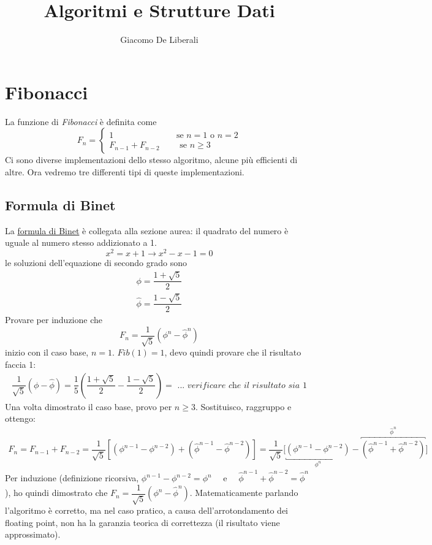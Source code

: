 \documentclass[italian]{article}
\author{Giacomo De Liberali}
\newcommand{\dateright}[1]{\normalfont{\normalsize{\hfill #1 \\}}}
\begin{document}
	
\title{Algoritmi e Strutture Dati}
\maketitle

\tableofcontents
\pagebreak

\section{Fibonacci}
\dateright{21 Settembre 2016}
La funzione di \textit{Fibonacci} è definita come
\[
	F_n =
	\begin{cases*}
		1 \qquad\qquad\qquad\quad \text{ se } n=1 \text{ o } n=2 \\
		F_{n-1} + F_{n-2} \qquad \text{ se } n \geq 3
	\end{cases*}
\]
Ci sono diverse implementazioni dello stesso algoritmo, alcune più efficienti di altre. Ora vedremo tre differenti tipi di queste implementazioni.
\subsection{Formula di Binet}
La \href{https://it.wikipedia.org/wiki/Jacques_Philippe_Marie_Binet#Formula_di_Binet_per_la_successione_di_Fibonacci}{formula di Binet} è collegata alla sezione aurea: il quadrato del numero è uguale al numero stesso addizionato a 1.
\[
	x^2 = x+1 \to x^2 - x - 1 = 0
\]
le soluzioni dell'equazione di secondo grado sono
\begin{gather*}
	\phi = \dfrac{1+\sqrt{5}}{2} \\
	\hat \phi = \dfrac{1-\sqrt{5}}{2}
\end{gather*}
Provare per induzione che
\[
	F_n = \dfrac{1}{\sqrt{5}}\left( \phi^n - \hat \phi^n \right)
\]
inizio con il caso base, $n=1$. $Fib(1) = 1$, devo quindi provare che il risultato faccia 1:
\begin{gather*}
	\dfrac{1}{\sqrt{5}}(\phi - \hat \phi) =
	\dfrac{1}{5} \left( \dfrac{1+\sqrt{5}}{2} - \dfrac{1-\sqrt{5}}{2}\right) = \textit{ ... verificare che il risultato sia } 1
\end{gather*}
Una volta dimostrato il caso base, provo per $n \geq 3$. Sostituisco, raggruppo e ottengo:
\begin{gather*}
	F_n = F_{n-1} + F_{n-2} = \dfrac{1}{\sqrt{5}} \left[ 
	\left( \phi^{n-1} - \phi^{n-2} \right) 
	+
	\left(  {\hat\phi}^{n-1} - {\hat\phi}^{n-2} \right)
	\right] 
	=
	\dfrac{1}{\sqrt{5}} \bigg[
	\underbracket{\left( \phi^{n-1} - \phi^{n-2} \right) }_{\phi^n} 
	-
	\overbracket{\left(  {\hat\phi}^{n-1} + {\hat\phi}^{n-2} \right)}^{{\hat{\phi}}^n}
	\bigg] 
\end{gather*}
Per induzione (definizione ricorsiva, $\phi^{n-1} - \phi^{n-2} = \phi^n\quad$ e $\quad{\hat\phi}^{n-1} + {\hat\phi}^{n-2} = {\hat\phi}^n$), ho quindi dimostrato che $F_n = \dfrac{1}{\sqrt{5}}\left( \phi^n - \hat \phi^n \right)$. Matematicamente parlando l'algoritmo è corretto, ma nel caso pratico, a causa dell'arrotondamento dei floating point, non ha la garanzia teorica di correttezza (il risultato viene approssimato).
\end{document}
